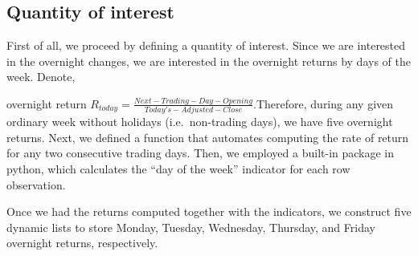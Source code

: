 \documentclass[letterpaper,10pt,english]{/Users/edwsurewin/anaconda/lib/python2.7/site-packages/sphinx/texinputs/sphinxhowto}
\begin{document}
        
    
\subsection{Quantity of interest}\label{quantity-of-interest}

First of all, we proceed by defining a quantity of interest. Since we
are interested in the overnight changes, we are interested in the
overnight returns by days of the week. Denote,

overnight return
$R_{today}= \frac{Next-Trading-Day-Opening}{Today's-Adjusted-Close}$.Therefore, during any given ordinary week without holidays
(i.e.~non-trading days), we have five overnight returns. Next, we
defined a function that automates computing the rate of return for any
two consecutive trading days. Then, we employed a built-in package in
python, which calculates the ``day of the week'' indicator for each row
observation.

Once we had the returns computed together with the indicators, we
construct five dynamic lists to store Monday, Tuesday, Wednesday,
Thursday, and Friday overnight returns, respectively.

\end{document}

